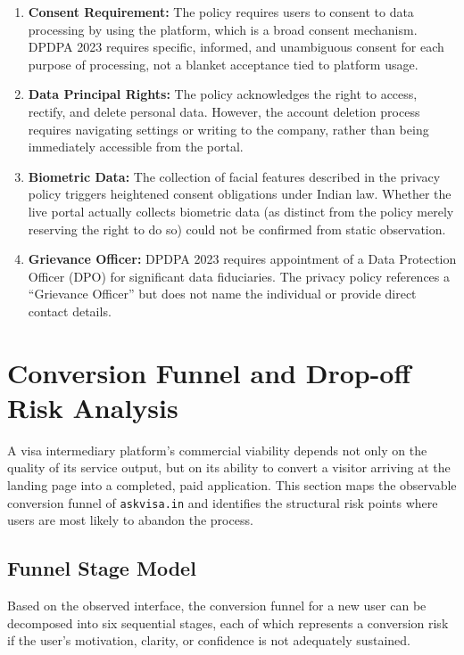 \documentclass[journal, 10pt, twoside]{IEEEtran}
\begin{document}
\begin{enumerate}
  \item \textbf{Consent Requirement:} The policy requires users to
  consent to data processing by using the platform, which is a
  broad consent mechanism. DPDPA 2023 requires specific, informed,
  and unambiguous consent for each purpose of processing, not a blanket
  acceptance tied to platform usage.

  \item \textbf{Data Principal Rights:} The policy acknowledges the
  right to access, rectify, and delete personal data. However, the
  account deletion process requires navigating settings or writing to
  the company, rather than being immediately accessible from the portal.

  \item \textbf{Biometric Data:} The collection of facial features
  described in the privacy policy triggers heightened consent obligations
  under Indian law. Whether the live portal actually collects biometric
  data (as distinct from the policy merely reserving the right to do so)
  could not be confirmed from static observation.

  \item \textbf{Grievance Officer:} DPDPA 2023 requires appointment of
  a Data Protection Officer (DPO) for significant data fiduciaries.
  The privacy policy references a ``Grievance Officer'' but does not
  name the individual or provide direct contact details.
\end{enumerate}

\section{Conversion Funnel and Drop-off Risk Analysis}
\label{sec:conversion}

A visa intermediary platform's commercial viability depends not only on the
quality of its service output, but on its ability to convert a visitor
arriving at the landing page into a completed, paid application. This section
maps the observable conversion funnel of \texttt{askvisa.in} and identifies
the structural risk points where users are most likely to abandon the process.

\subsection{Funnel Stage Model}
Based on the observed interface, the conversion funnel for a new user can
be decomposed into six sequential stages, each of which represents a
conversion risk if the user's motivation, clarity, or confidence is not
adequately sustained.
\end{document}
